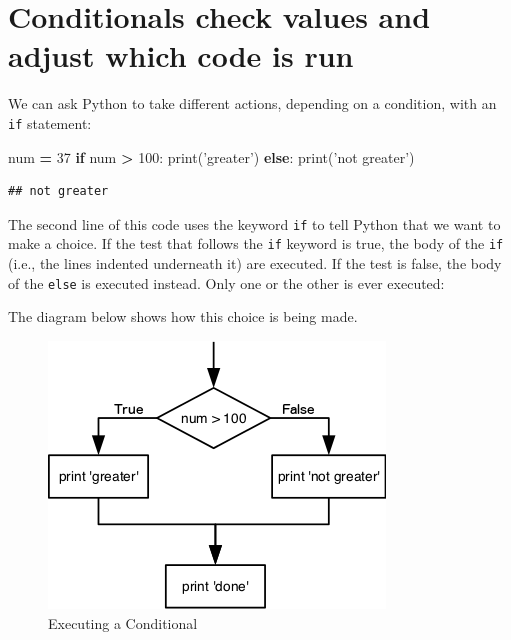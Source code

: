 \documentclass[]{book}
\newenvironment{Shaded}{\begin{snugshade}}{\end{snugshade}}
\newcommand{\BuiltInTok}[1]{#1}
\newcommand{\ControlFlowTok}[1]{\textcolor[rgb]{0.13,0.29,0.53}{\textbf{#1}}}
\newcommand{\DecValTok}[1]{\textcolor[rgb]{0.00,0.00,0.81}{#1}}
\newcommand{\NormalTok}[1]{#1}
\newcommand{\OperatorTok}[1]{\textcolor[rgb]{0.81,0.36,0.00}{\textbf{#1}}}
\newcommand{\StringTok}[1]{\textcolor[rgb]{0.31,0.60,0.02}{#1}}
\theoremstyle{definition}
\theoremstyle{definition}
\theoremstyle{definition}
\theoremstyle{remark}
\begin{document}
\hypertarget{conditionals-check-values-and-adjust-which-code-is-run}{%
\section{Conditionals check values and adjust which code is
run}\label{conditionals-check-values-and-adjust-which-code-is-run}}

We can ask Python to take different actions, depending on a condition,
with an \texttt{if} statement:

\begin{Shaded}
\begin{Highlighting}[]
\NormalTok{num }\OperatorTok{=} \DecValTok{37}
\ControlFlowTok{if}\NormalTok{ num }\OperatorTok{>} \DecValTok{100}\NormalTok{:}
    \BuiltInTok{print}\NormalTok{(}\StringTok{'greater'}\NormalTok{)}
\ControlFlowTok{else}\NormalTok{:}
    \BuiltInTok{print}\NormalTok{(}\StringTok{'not greater'}\NormalTok{)}
\end{Highlighting}
\end{Shaded}

\begin{verbatim}
## not greater
\end{verbatim}

The second line of this code uses the keyword \texttt{if} to tell Python
that we want to make a choice. If the test that follows the \texttt{if}
keyword is true, the body of the \texttt{if} (i.e., the lines indented
underneath it) are executed. If the test is false, the body of the
\texttt{else} is executed instead. Only one or the other is ever
executed:

The diagram below shows how this choice is being made.

\begin{figure}
\centering
\includegraphics{assets/python-flowchart-conditional.png}
\caption{Executing a Conditional}
\end{figure}
\end{document}

